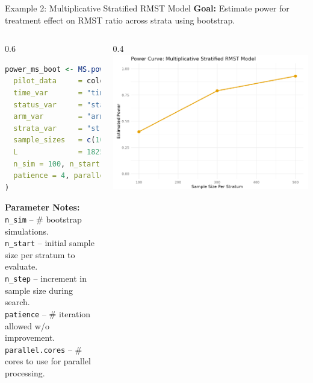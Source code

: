 \documentclass{beamer}
\begin{document}
\begin{frame}[fragile]{Example 2: Multiplicative Stratified RMST Model}
\textbf{Goal:} Estimate power for treatment effect on RMST ratio across strata using bootstrap.

\begin{columns}[T,onlytextwidth]
  \begin{column}{0.6\textwidth}
  \scriptsize
    \begin{lstlisting}[language=R]
power_ms_boot <- MS.power.boot(
  pilot_data     = colon_death,
  time_var       = "time",
  status_var     = "status",
  arm_var        = "arm",
  strata_var     = "strata",
  sample_sizes   = c(100, 300, 500),
  L              = 1825,
  n_sim = 100, n_start = 100, n_step = 50,
  patience = 4, parallel.cores = 10
)
    \end{lstlisting}
    {\scriptsize
    \textbf{Parameter Notes:} \\
    \texttt{n\_sim} – \# bootstrap simulations. \\
    \texttt{n\_start} – initial sample size per stratum to evaluate. \\
    \texttt{n\_step} – increment in sample size during search. \\
    \texttt{patience} – \# iteration allowed w/o improvement. \\
    \texttt{parallel.cores} – \# cores to use for parallel processing.\\
    
    }
  \end{column}

  \begin{column}{0.4\textwidth}
    \centering
    \includegraphics[width=\linewidth]{images/Example_MS.png}


\end{column}
\end{columns}
\end{frame}
\end{document}
